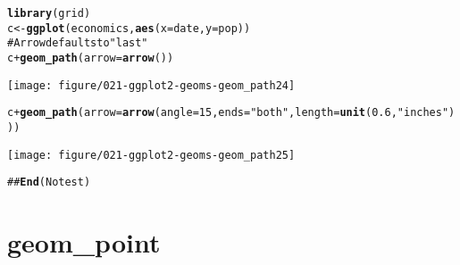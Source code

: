 \documentclass[a4paper,titlepage]{tufte-handout}\usepackage{graphicx, color}
\makeatletter
\def\maxwidth{ %
  \ifdim\Gin@nat@width>\linewidth
    \linewidth
  \else
    \Gin@nat@width
  \fi
}
\newcommand{\hlfunctioncall}[1]{\textcolor[rgb]{0.501960784313725,0,0.329411764705882}{\textbf{#1}}}%
\newcommand{\hlstring}[1]{\textcolor[rgb]{0.6,0.6,1}{#1}}%
\newcommand{\hlcomment}[1]{\textcolor[rgb]{0.180392156862745,0.6,0.341176470588235}{#1}}%
\newenvironment{kframe}{%
 \def\at@end@of@kframe{}%
 \ifinner\ifhmode%
  \def\at@end@of@kframe{\end{minipage}}%
  \begin{minipage}{\columnwidth}%
 \fi\fi%
 \def\FrameCommand##1{\hskip\@totalleftmargin \hskip-\fboxsep
 \colorbox{shadecolor}{##1}\hskip-\fboxsep
     \hskip-\linewidth \hskip-\@totalleftmargin \hskip\columnwidth}%
 \MakeFramed {\advance\hsize-\width
   \@totalleftmargin\z@ \linewidth\hsize
   \@setminipage}}%
 {\par\unskip\endMakeFramed%
 \at@end@of@kframe}
\newenvironment{knitrout}{}{} %
\makeatother
\begin{document}
\begin{knitrout}
\begin{kframe}
\begin{alltt}
\hlfunctioncall{library}(grid)
c <- \hlfunctioncall{ggplot}(economics, \hlfunctioncall{aes}(x = date, y = pop))
# Arrow defaults to \hlstring{"last"}
c + \hlfunctioncall{geom_path}(arrow = \hlfunctioncall{arrow}())
\end{alltt}
\end{kframe}\texttt{[image: figure/021-ggplot2-geoms-geom\_path24]} \begin{kframe}\begin{alltt}
c + \hlfunctioncall{geom_path}(arrow = \hlfunctioncall{arrow}(angle = 15, ends = \hlstring{"both"}, length = \hlfunctioncall{unit}(0.6, \hlstring{"inches"})))
\end{alltt}
\end{kframe}\texttt{[image: figure/021-ggplot2-geoms-geom\_path25]} \begin{kframe}\begin{alltt}
\hlcomment{## \hlfunctioncall{End}(No test)}
\end{alltt}
\end{kframe}
\end{knitrout}


\section{geom\_point}
\end{document}
